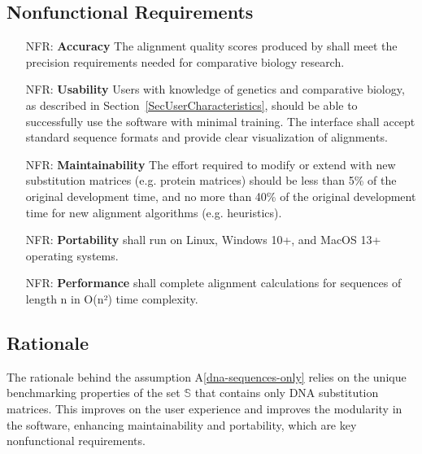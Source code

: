 \documentclass[12pt]{article}
\newcommand{\aref}[1]{A\ref{#1}}
\newcounter{nfrnum} %
\begin{document}
\subsection{Nonfunctional Requirements}


\noindent \begin{itemize}

  \item[NFR\refstepcounter{nfrnum}\thenfrnum \label{NFR_Accuracy}:]
  \textbf{Accuracy} The alignment quality scores produced by \progname{} shall meet the 
  precision requirements needed for comparative biology research. 
  
  \item[NFR\refstepcounter{nfrnum}\thenfrnum \label{NFR_Usability}:] \textbf{Usability}
  Users with knowledge of genetics and comparative biology, as described in Section~\ref{SecUserCharacteristics}, 
  should be able to successfully use the software with minimal training. 
  The interface shall accept standard sequence formats and provide clear visualization of alignments.
  
  \item[NFR\refstepcounter{nfrnum}\thenfrnum \label{NFR_Maintainability}:]
  \textbf{Maintainability} The effort required to modify or extend \progname{} 
  with new substitution matrices (e.g. protein matrices) should be less than 5\% 
  of the original development time, and no more than 40\% of the original development time 
  for new alignment algorithms (e.g. heuristics).
  
  \item[NFR\refstepcounter{nfrnum}\thenfrnum \label{NFR_Portability}:]
  \textbf{Portability} \progname{} shall run on Linux, Windows 10+, and MacOS 13+ operating systems.
  
  \item[NFR\refstepcounter{nfrnum}\thenfrnum \label{NFR_Performance}:]
  \textbf{Performance} \progname{} shall complete alignment calculations for sequences of length n in O(n²) time complexity.

\end{itemize}

\subsection{Rationale}

The rationale behind the assumption \aref{dna-sequences-only} relies on the unique 
benchmarking properties of the set $\mathbb{S}$ that contains only DNA substitution matrices.
This improves on the user experience and improves the modularity in the software, enhancing 
maintainability and portability, which are key nonfunctional requirements.
\end{document}
